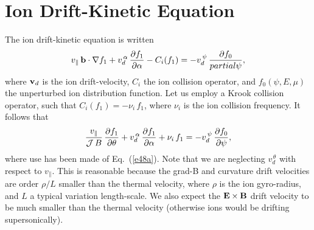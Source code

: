 \documentclass[12pt,prb,aps,notitlepage]{revtex4-1}
\begin{document}
\section{Ion Drift-Kinetic Equation}
 The ion drift-kinetic equation is written
 \begin{equation}
 v_\parallel\,{\bf b}\cdot\nabla f_1 + v_d^{\,\alpha}\,\frac{\partial f_1}{\partial\alpha} - C_i(f_1)=- v_d^{\,\psi}\,\frac{\partial f_0}{partial\psi},
 \end{equation}
 where ${\bf v}_d$ is the ion drift-velocity, $C_i$ the ion collision operator, and $f_0(\psi,E,\mu)$ the unperturbed ion distribution function. Let us
 employ a Krook collision operator, such that $C_i(f_1)= - \nu_i\,f_1$, where $\nu_i$ is the ion collision frequency. It follows that
 \begin{equation}\label{e71}
 \frac{v_\parallel}{{\cal J}\,B}\,\frac{\partial f_1}{\partial\theta} + v_d^{\,\alpha}\,\frac{\partial f_1}{\partial\alpha} + \nu_i\,f_1= - v_d^{\,\psi}\,\frac{\partial f_0}{\partial\psi},
 \end{equation}
 where use has been made of Eq.~(\ref{e48a}).
 Note that we are neglecting $v_d^{\,\theta}$ with respect to $v_\parallel$. This is reasonable because the grad-B and curvature drift velocities are
 order $\rho/L$ smaller than the thermal velocity, where $\rho$ is the ion gyro-radius, and $L$ a typical variation length-scale. We also
 expect the ${\bf E}\times{\bf B}$ drift velocity to be much smaller than the thermal velocity (otherwise ions would be drifting supersonically). 
 
\end{document}
